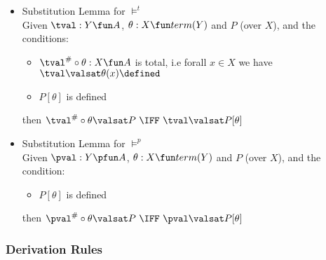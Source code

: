 \begin{itemize}
  \item Substitution Lemma for $\models^t$ 
  \\ Given $\tval:Y \fun A$, $\theta:X \fun term(Y)$ and $P$ (over $X$), and the conditions:
    \begin{itemize}
      \item $\tval^{\#} \circ \theta : X \fun A$ is total, i.e forall $x \in X$
       we have $\tval \valsat \theta(x)\defined$
      \item $P[\theta]$ is defined
    \end{itemize}
    then
    $\tval^{\#} \circ \theta \valsat P
       ~\IFF~
       \tval \valsat P[\theta]
    $
  \item Substitution Lemma for $\models^p$ 
  \\ Given $\pval:Y \pfun A$, $\theta:X \fun term(Y)$ and $P$ (over $X$), and the condition:
    \begin{itemize}
      \item $P[\theta]$ is defined
    \end{itemize}
    then
    $\pval^{\#} \circ \theta \valsat P
       ~\IFF~
       \pval \valsat P[\theta]
    $
\end{itemize}

\subsubsection{Derivation Rules}

